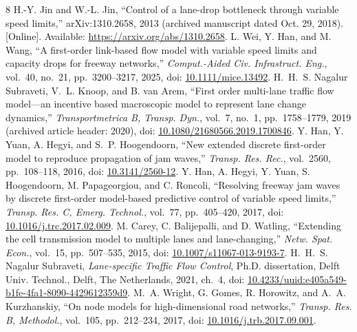 \documentclass[11pt,a4paper]{article}
\newcommand{\head}[1]{\par\vspace{5pt}\noindent\textbf{#1}\par\nobreak\vspace{1pt}}
\begin{document}
\par\pdfsavepos
{}
\makeatletter
\renewcommand{\section}{\@ifstar{\head}{\head}}
\makeatother
\begin{thebibliography}{8}
\setlength{\itemsep}{4pt}\setlength{\parskip}{0pt}
 H.-Y. Jin and W.-L. Jin, ``Control of a lane-drop bottleneck
through variable speed limits,'' arXiv:1310.2658, 2013 (archived manuscript
dated Oct. 29, 2018). [Online]. Available:
\url{https://arxiv.org/abs/1310.2658}.
 L. Wei, Y. Han, and M. Wang, ``A first-order link-based flow
model with variable speed limits and capacity drops for freeway networks,''
\emph{Comput.-Aided Civ. Infrastruct. Eng.}, vol.~40, no.~21,
pp.~3200--3217, 2025, doi:
\href{https://doi.org/10.1111/mice.13492}{10.1111/mice.13492}.
 H.~H.~S. Nagalur Subraveti, V.~L. Knoop, and B. van Arem,
``First order multi-lane traffic flow model---an incentive based macroscopic
model to represent lane change dynamics,'' \emph{Transportmetrica B, Transp.
Dyn.}, vol.~7, no.~1, pp.~1758--1779, 2019 (archived article header: 2020),
doi: \href{https://doi.org/10.1080/21680566.2019.1700846}{10.1080/21680566.2019.1700846}.
 Y. Han, Y. Yuan, A. Hegyi, and S.~P. Hoogendoorn,
``New extended discrete first-order model to reproduce propagation of jam
waves,'' \emph{Transp. Res. Rec.}, vol.~2560, pp.~108--118, 2016, doi:
\href{https://doi.org/10.3141/2560-12}{10.3141/2560-12}.
 Y. Han, A. Hegyi, Y. Yuan, S. Hoogendoorn,
M. Papageorgiou, and C. Roncoli, ``Resolving freeway jam waves by discrete
first-order model-based predictive control of variable speed limits,''
\emph{Transp. Res. C, Emerg. Technol.}, vol.~77, pp.~405--420, 2017, doi:
\href{https://doi.org/10.1016/j.trc.2017.02.009}{10.1016/j.trc.2017.02.009}.
 M. Carey, C. Balijepalli, and D. Watling, ``Extending the
cell transmission model to multiple lanes and lane-changing,''
\emph{Netw. Spat. Econ.}, vol.~15, pp.~507--535, 2015, doi:
\href{https://doi.org/10.1007/s11067-013-9193-7}{10.1007/s11067-013-9193-7}.
 H.~H.~S. Nagalur Subraveti, \emph{Lane-specific Traffic
Flow Control}, Ph.D. dissertation, Delft Univ. Technol., Delft, The
Netherlands, 2021, ch.~4, doi:
\href{https://doi.org/10.4233/uuid:e405a549-b1fe-4fa1-8090-4429612359d9}{10.4233/uuid:e405a549-b1fe-4fa1-8090-4429612359d9}.
 M.~A. Wright, G. Gomes, R. Horowitz, and
A.~A. Kurzhanskiy, ``On node models for high-dimensional road networks,''
\emph{Transp. Res. B, Methodol.}, vol.~105, pp.~212--234, 2017, doi:
\href{https://doi.org/10.1016/j.trb.2017.09.001}{10.1016/j.trb.2017.09.001}.
\end{thebibliography}
\end{document}
